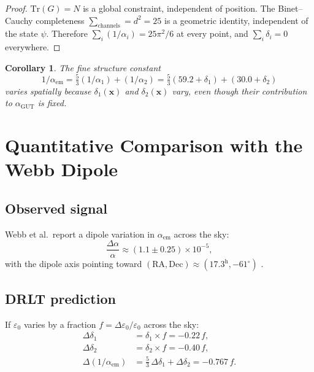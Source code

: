 \documentclass[12pt]{article}
\newtheorem{corollary}[theorem]{Corollary}
\theoremstyle{remark}
\begin{document}
\begin{proof}
$\text{Tr}(G) = N$ is a global constraint, independent of position. The Binet--Cauchy completeness $\sum_\text{channels} = d^2 = 25$ is a geometric identity, independent of the state $\psi$. Therefore $\sum_i(1/\alpha_i) = 25\pi^2/6$ at every point, and $\sum_i \delta_i = 0$ everywhere.
\end{proof}

\begin{corollary}
The fine structure constant
\begin{equation}
1/\alpha_\text{em} = \tfrac{5}{3}(1/\alpha_1) + (1/\alpha_2) = \tfrac{5}{3}(59.2 + \delta_1) + (30.0 + \delta_2)
\end{equation}
varies spatially because $\delta_1(\mathbf{x})$ and $\delta_2(\mathbf{x})$ vary, even though their contribution to $\alpha_\text{GUT}$ is fixed.
\end{corollary}

\section{Quantitative Comparison with the Webb Dipole}

\subsection{Observed signal}

Webb et al.\ report a dipole variation in $\alpha_\text{em}$ across the sky:
\begin{equation}
\frac{\Delta\alpha}{\alpha} \approx (1.1 \pm 0.25) \times 10^{-5},
\end{equation}
with the dipole axis pointing toward $(\text{RA}, \text{Dec}) \approx (17.3^\text{h}, -61^\circ)$ \cite{Webb}.

\subsection{DRLT prediction}

If $\varepsilon_0$ varies by a fraction $f = \Delta\varepsilon_0/\varepsilon_0$ across the sky:
\begin{align}
\Delta\delta_1 &= \delta_1 \times f = -0.22\,f, \\
\Delta\delta_2 &= \delta_2 \times f = -0.40\,f, \\
\Delta(1/\alpha_\text{em}) &= \tfrac{5}{3}\,\Delta\delta_1 + \Delta\delta_2 = -0.767\,f.
\end{align}
\end{document}
